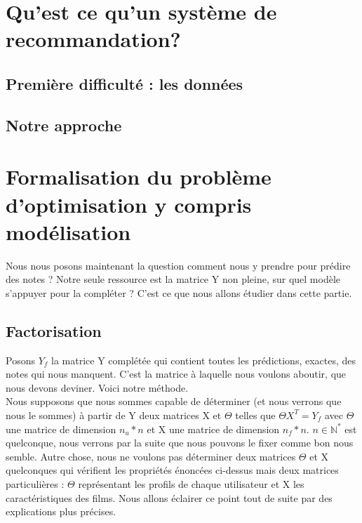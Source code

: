 \documentclass[a4paper,10pt]{article}
\title{}
\author{}
\begin{document}
\maketitle

\begin{abstract}
\end{abstract}

\section{Qu'est ce qu'un système de recommandation?}
\subsection{Première difficulté : les données}
\subsection{Notre approche}

\subsection{}
\section{Formalisation du problème d'optimisation y compris modélisation}

Nous nous posons maintenant la question comment nous y prendre pour prédire des notes ?
Notre seule ressource est la matrice Y non pleine, sur quel modèle s'appuyer pour la compléter ?
C'est ce que nous allons étudier dans cette partie.

\subsection{Factorisation}

Posons $Y_f$ la matrice Y complétée qui contient toutes les prédictions, exactes, des notes qui nous manquent. C'est la matrice à laquelle nous voulons aboutir, que nous devons deviner. Voici notre méthode.\\

Nous supposons que nous sommes capable de déterminer (et nous verrons que nous le sommes) à partir de Y deux matrices X et $\Theta$ telles que $\Theta X^T = Y_f$ avec $\Theta$ une matrice de dimension $n_u * n$ et X une matrice de dimension $n_f * n$. $n \in \mathbb{N}^*$ est quelconque, nous verrons par la suite que nous pouvons le fixer comme bon nous semble.
Autre chose, nous ne voulons pas déterminer deux matrices $\Theta$ et X quelconques qui vérifient les propriétés énoncées ci-dessus mais deux matrices particulières : $\Theta$ représentant les profils de chaque utilisateur et X les caractéristiques des films. Nous allons éclairer ce point tout de suite par des explications plus précises.\\
\end{document}
